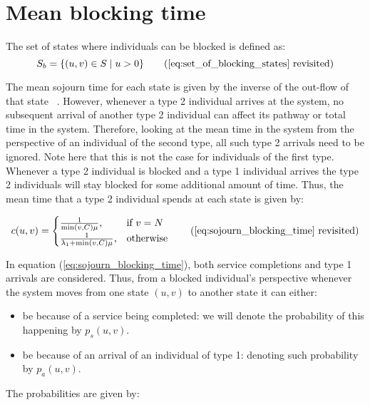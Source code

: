 \section{Mean blocking time} \label{sec:appendix_mean_blocking}

The set of states where individuals can be blocked is defined as:
\begin{equation*}
    S_b = \{(u,v) \in S \; | \; u > 0\} 
    \tag{\ref{eq:set_of_blocking_states} revisited}
\end{equation*}

The mean sojourn time for each state is given by the inverse of the out-flow of
that state ~\cite{Stewart2019}.
However, whenever a type 2 individual arrives at the system, no subsequent 
arrival of another type 2 individual can affect its pathway or total time in 
the system.
Therefore, looking at the mean time in the system from the perspective of an 
individual of the second type, all such type 2 arrivals need to be ignored.
Note here that this is not the case for individuals of the first type.
Whenever a type 2 individual is blocked and a type 1 individual arrives the type
2 individuals will stay blocked for some additional amount of time.
Thus, the mean time that a type 2 individual spends at each state is given by:

\begin{equation*}
    c(u,v) = 
    \begin{cases}
        \frac{1}{\min(v,C) \mu}, & \text{if } v = N\\
        \frac{1}{\lambda_1 + \min(v,C) \mu}, & \text{otherwise}
    \end{cases} 
    \tag{\ref{eq:sojourn_blocking_time} revisited}
\end{equation*}

In equation (\ref{eq:sojourn_blocking_time}), both service completions and 
type 1 arrivals are considered. 
Thus, from a blocked individual's perspective whenever the system moves from one 
state \((u,v)\)
to another state it can either:

\begin{itemize}
    \item be because of a service being completed: we will denote the probability 
    of this happening by \(p_s(u,v)\). 
    \item be because of an arrival of an individual of type 1: denoting such 
    probability by \(p_a(u,v)\).
\end{itemize}
The probabilities are given by:

